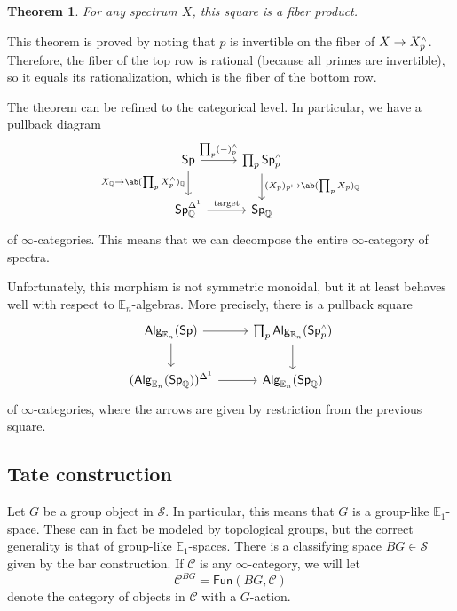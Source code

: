 \documentclass[10pt, oneside]{memoir}
\newtheorem{thm}{Theorem}[subsection]
\theoremstyle{definition}
\theoremstyle{remark}
\theoremstyle{plain}
\theoremstyle{definition}
\theoremstyle{remark}
\newcommand{\Q}{\mathbb{Q}}
\newcommand{\E}{\mathbb{E}}
\newcommand{\mc}[1]{\mathcal{#1}}
\newcommand{\mr}[1]{\mathrm{#1}}
\newcommand{\ms}[1]{\mathsf{#1}}
\newcommand{\1}{\mathbf{1}}
\newcommand{\2}{\mathbf{2}}
\newcommand{\3}{\mathbf{3}}
\newcommand{\sw}{\mathsmaller{\wedge}}
\begin{document}
\begin{thm}
    For any spectrum \(X \), this square is a fiber product.
\end{thm}

This theorem is proved by noting that \(p \) is invertible on the fiber of \(X \to X_p^{\sw} \). Therefore, the fiber of the top row is rational (because all primes are invertible), so it equals its rationalization, which is the fiber of the bottom row.

The theorem can be refined to the categorical level. In particular, we have a pullback diagram
\begin{equation*}
\begin{tikzcd}
    \ms{Sp} \ar{r}{\prod_p (-)_p^{\sw}} \ar{d}[swap]{X_{\Q} \to \ab(\prod_p X_p^{\sw})_{\Q}} & \prod_p \ms{Sp}_p^{\sw} \ar{d}{(X_p)_p \mapsto \ab(\prod_p X_p)_{\Q}} \\
    \ms{Sp}_{\Q}^{\Delta^1} \ar{r}{\mr{target}} & \ms{Sp}_{\Q}
\end{tikzcd}
\end{equation*}
of \(\infty \)-categories. This means that we can decompose the entire \(\infty \)-category of spectra.

Unfortunately, this morphism is not symmetric monoidal, but it at least behaves well with respect to \(\E_n \)-algebras. More precisely, there is a pullback square
\begin{equation*}
\begin{tikzcd}
    \ms{Alg}_{\E_n}(\ms{Sp}) \ar{r} \ar{d} & \prod_p \ms{Alg}_{\E_n}(\ms{Sp}_p^{\sw}) \ar{d} \\
    (\ms{Alg}_{\E_n}(\ms{Sp}_{\Q}))^{\Delta^1} \ar{r} & \ms{Alg}_{\E_n}(\ms{Sp}_{\Q})
\end{tikzcd}
\end{equation*}
of \(\infty \)-categories, where the arrows are given by restriction from the previous square.


\subsection{Tate construction}%
\label{sub:Tate construction}

Let \(G \) be a group object in \(\mc{S} \). In particular, this means that \(G \) is a group-like \(\E_1 \)-space. These can in fact be modeled by topological groups, but the correct generality is that of group-like \(\E_1 \)-spaces. There is a classifying space \(BG \in \mc{S} \) given by the bar construction. If \(\mc{C} \) is any \(\infty \)-category, we will let
\[ \mc{C}^{BG} = \ms{Fun}(BG, \mc{C}) \]
denote the category of objects in \(\mc{C} \) with a \(G \)-action.
\end{document}
